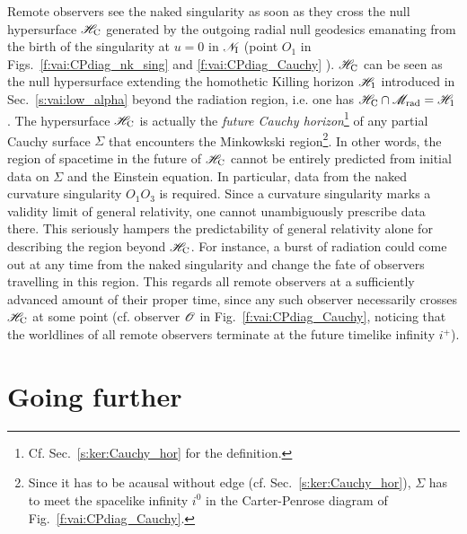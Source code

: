 Remote observers see the naked singularity as soon as they cross
the null hypersurface $\mathscr{H}_{\rm C}$ generated by the outgoing radial null geodesics
emanating from the birth of the singularity at $u=0$ in $\mathscr{N}_{\rm I}$
(point $O_1$ in Figs.~\ref{f:vai:CPdiag_nk_sing} and \ref{f:vai:CPdiag_Cauchy} ).
$\mathscr{H}_{\rm C}$ can be seen as the null hypersurface extending the
homothetic Killing horizon $\mathscr{H}_1$ introduced in Sec.~\ref{s:vai:low_alpha}
beyond the radiation region, i.e. one has
$\mathscr{H}_{\rm C} \cap \mathscr{M}_{\rm rad} = \mathscr{H}_1$.
The hypersurface $\mathscr{H}_{\rm C}$ is actually the \emph{future Cauchy horizon}\footnote{Cf. Sec.~\ref{s:ker:Cauchy_hor} for the definition.}
of any partial Cauchy surface $\Sigma$ that encounters the Minkowkski region\footnote{Since it
has to be acausal without edge (cf. Sec.~\ref{s:ker:Cauchy_hor}), $\Sigma$ has to meet the spacelike infinity $i^0$
in the Carter-Penrose diagram of Fig.~\ref{f:vai:CPdiag_Cauchy}.}.
In other words, the region of spacetime in the future of $\mathscr{H}_{\rm C}$ cannot
be entirely predicted from initial data on $\Sigma$ and the Einstein equation.
In particular, data from the naked curvature singularity $O_1 O_3$ is required.
Since a curvature singularity marks a validity limit of general relativity,
one cannot unambiguously prescribe data there. This seriously hampers the
predictability of general relativity alone for describing the region
beyond $\mathscr{H}_{\rm C}$. For instance, a burst of radiation could come
out at any time from the naked singularity and change the fate of observers
travelling in this region. This regards all remote observers at a sufficiently
advanced amount of their proper time, since any such observer necessarily crosses
$\mathscr{H}_{\rm C}$ at some point (cf. observer $\mathscr{O}$ in Fig.~\ref{f:vai:CPdiag_Cauchy},
noticing that the worldlines of all remote observers
terminate at the future timelike infinity $i^+$).





\section{Going further}

